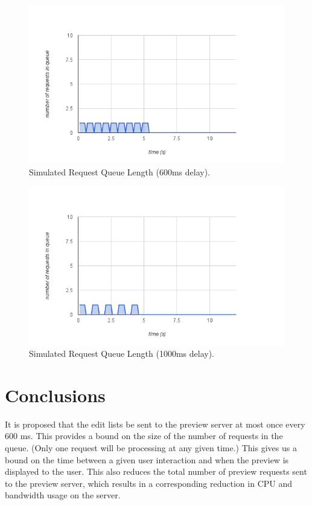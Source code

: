 \documentclass[se,resubmit]{uw-wkrpt}
\begin{document}
\begin{figure}
  \centering
  \includegraphics[width=6.25in]{sim-600ms}
  \caption{Simulated Request Queue Length (600ms delay).}
  \label{fig:sim-600ms}
\end{figure}

\begin{figure}
  \centering
  \includegraphics[width=6.25in]{sim-1000ms}
  \caption{Simulated Request Queue Length (1000ms delay).}
  \label{fig:sim-1000ms}
\end{figure}

\section{Conclusions}
It is proposed that the edit lists be sent to the preview server at most
once every 600 ms. This provides a bound on the size of the number of
requests in the queue. (Only one request will be processing at any given
time.) This gives us a bound on the time between a given user interaction
and when the preview is displayed to the user. This also reduces the total
number of preview requests sent to the preview server, which results in a
corresponding reduction in CPU and bandwidth usage on the server.
\end{document}

